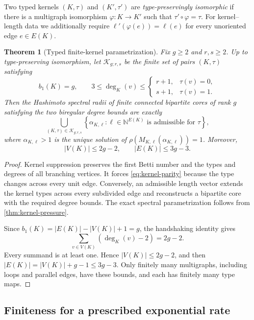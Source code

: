 \documentclass[11pt]{amsart}
\theoremstyle{plain}
\newtheorem{theorem}{Theorem}[section]
\theoremstyle{definition}
\theoremstyle{remark}
\begin{document}
Two typed kernels \((K,\tau)\) and \((K',\tau')\) are
\emph{type-preservingly isomorphic} if there is a multigraph isomorphism
\(\varphi:K\to K'\) such that \(\tau'\circ\varphi=\tau\).  For kernel--length
data we additionally require
\(\ell'(\varphi(e))=\ell(e)\) for every unoriented edge \(e\in E(K)\).

\begin{theorem}[Typed finite-kernel parametrization]
\label{thm:fixed-rank-kernels}
Fix \(g\geq2\) and \(r,s\geq2\).  Up to type-preserving isomorphism, let
\(\mathcal K_{g;r,s}\) be the finite set of pairs \((K,\tau)\) satisfying
\[
  b_1(K)=g,
  \qquad
  3\leq\deg_K(v)\leq
  \begin{cases}
    r+1,&\tau(v)=0,\\
    s+1,&\tau(v)=1.
  \end{cases}
\]
Then the Hashimoto spectral radii of finite connected bipartite cores of
rank \(g\) satisfying the two biregular degree bounds are exactly
\begin{equation}\label{eq:fixed-rank-parametrization}
  \bigcup_{(K,\tau)\in\mathcal K_{g;r,s}}
  \left\{
    \alpha_{K,\ell}:\ell\in\mathbb N^{E(K)}
      \text{ is admissible for }\tau
  \right\},
\end{equation}
where \(\alpha_{K,\ell}>1\) is the unique solution of
\(\rho(M_{K,\ell}(\alpha_{K,\ell}))=1\).  Moreover,
\[
  |V(K)|\leq2g-2,
  \qquad
  |E(K)|\leq3g-3.
\]
\end{theorem}

\begin{proof}
Kernel suppression preserves the first Betti number and the types and
degrees of all branching vertices.  It forces \eqref{eq:kernel-parity}
because the type changes across every unit edge.  Conversely, an admissible
length vector extends the kernel types across every subdivided edge and
reconstructs a bipartite core with the required degree bounds.  The exact
spectral parametrization follows from \cref{thm:kernel-pressure}.

Since \(b_1(K)=|E(K)|-|V(K)|+1=g\), the handshaking identity gives
\[
  \sum_{v\in V(K)}(\deg_K(v)-2)=2g-2.
\]
Every summand is at least one.  Hence \(|V(K)|\leq2g-2\), and then
\(|E(K)|=|V(K)|+g-1\leq3g-3\).  Only finitely many multigraphs, including
loops and parallel edges, have these bounds, and each has finitely many type
maps.
\end{proof}

\subsection{Finiteness for a prescribed exponential rate}
\end{document}
